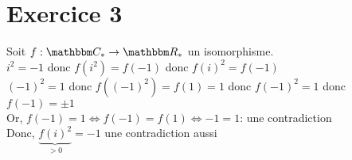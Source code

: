 \part{Exercice 3}

Soit $f: \C_* \to \R_*$ un isomorphisme.\\
$i^2 = -1$ donc $f(i^2) = f(-1)$ donc $f(i)^2 = f(-1)$\\
$(-1)^2 = 1$ donc $f\left( (-1)^2 \right) = f(1) = 1$ donc $f(-1)^2 = 1$ donc $f(-1) = \pm 1$ \\
Or, $f(-1) = 1 \iff f(-1) = f(1) \iff -1 = 1$: une contradiction\\
Donc, $\underbrace{f(i)^2}_{>0} = -1$ une contradiction aussi
